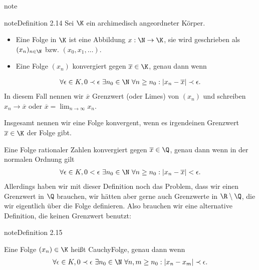 \documentclass[letterpaper,10pt,english]{jupyterBook}
\begin{document}
\begin{sphinxadmonition}{note}
\begin{sphinxadmonition}{note}{Definition 2.14}
Sei \(\K\) ein archimedisch angeordneter Körper.
\begin{itemize}
\item {} 
Eine Folge in \(\K\) ist eine Abbildung \(x: \N \rightarrow \K\), sie wird geschrieben als \((x_n)_{n \in \N}\) bzw.
\((x_0,x_1,\ldots)\).

\item {} 
Eine Folge \((x_n)\) konvergiert gegen \(\overline{x} \in \K\), genau dann wenn

\end{itemize}
\begin{equation*}
\begin{split} \forall \epsilon \in K, 0 \prec \epsilon ~ \exists n_0 \in \N ~\forall n \geq n_0: |x_n - \overline{x}| \prec \epsilon.\end{split}
\end{equation*}
In diesem Fall nennen wir \(\overline{x}\) Grenzwert (oder Limes) von \((x_n)\) und schreiben \(x_n \rightarrow \overline{x}\) oder \(\overline{x}= \lim_{n \rightarrow \infty} x_n. \)

Insgesamt nennen wir eine Folge konvergent, wenn es irgendeinen Grenzwert \(\overline{x} \in \K\) der Folge gibt.
\end{sphinxadmonition}
\end{sphinxadmonition}

Eine Folge rationaler Zahlen konvergiert gegen \(\overline{x} \in \Q\), genau dann wenn in der normalen Ordnung gilt
\begin{equation*}
\begin{split} \forall \epsilon \in K, 0 < \epsilon ~ \exists n_0 \in \N ~\forall n \geq n_0: |x_n - \overline{x}| < \epsilon.\end{split}
\end{equation*}
Allerdings haben wir mit dieser Definition noch das Problem, dass wir einen Grenzwert in \(\Q\) brauchen, wir hätten aber gerne auch Grenzwerte in \(\R \setminus \Q\), die wir eigentlich über die Folge definieren. Also brauchen wir eine alternative Definition, die keinen Grenzwert benutzt:
\label{grundlagen/zahlensysteme:definition-14}
\begin{sphinxadmonition}{note}{Definition 2.15}



Eine Folge \((x_n) \in \K\) heißt Cauchy\sphinxhyphen{}Folge, genau dann wenn
\begin{equation*}
\begin{split} \forall \epsilon \in K, 0 \prec \epsilon ~ \exists n_0 \in \N ~\forall n,m  \geq n_0: |x_n - x_m| \prec \epsilon.\end{split}
\end{equation*}\end{sphinxadmonition}
\end{document}
